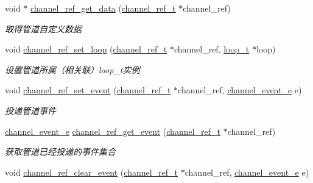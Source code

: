 \begin{DoxyCompactItemize}
void $\ast$ \hyperlink{a00049_ae6545b9c070a0bab99ccfefdf0b4a999_ae6545b9c070a0bab99ccfefdf0b4a999}{channel\+\_\+ref\+\_\+get\+\_\+data} (\hyperlink{a00051_a151271c9d188ef28d4d24bb81dcc1263_a151271c9d188ef28d4d24bb81dcc1263}{channel\+\_\+ref\+\_\+t} $\ast$channel\+\_\+ref)
\begin{DoxyCompactList}\small\item\em 取得管道自定义数据 \end{DoxyCompactList}\item 
void \hyperlink{a00049_ad7b9246a8768f761ffdd1756ea389181_ad7b9246a8768f761ffdd1756ea389181}{channel\+\_\+ref\+\_\+set\+\_\+loop} (\hyperlink{a00051_a151271c9d188ef28d4d24bb81dcc1263_a151271c9d188ef28d4d24bb81dcc1263}{channel\+\_\+ref\+\_\+t} $\ast$channel\+\_\+ref, \hyperlink{a00051_a9c3ad1cd2de83e09f3a7b59fa82c94ee_a9c3ad1cd2de83e09f3a7b59fa82c94ee}{loop\+\_\+t} $\ast$loop)
\begin{DoxyCompactList}\small\item\em 设置管道所属（相关联）loop\+\_\+t实例 \end{DoxyCompactList}\item 
void \hyperlink{a00049_aaa459c5e4bd63d343a31b5968a3ae5bd_aaa459c5e4bd63d343a31b5968a3ae5bd}{channel\+\_\+ref\+\_\+set\+\_\+event} (\hyperlink{a00051_a151271c9d188ef28d4d24bb81dcc1263_a151271c9d188ef28d4d24bb81dcc1263}{channel\+\_\+ref\+\_\+t} $\ast$channel\+\_\+ref, \hyperlink{a00051_a5ad43ab162fdf9ad53cde10ed3d87d99_a5ad43ab162fdf9ad53cde10ed3d87d99}{channel\+\_\+event\+\_\+e} e)
\begin{DoxyCompactList}\small\item\em 投递管道事件 \end{DoxyCompactList}\item 
\hyperlink{a00051_a5ad43ab162fdf9ad53cde10ed3d87d99_a5ad43ab162fdf9ad53cde10ed3d87d99}{channel\+\_\+event\+\_\+e} \hyperlink{a00049_ac24dbde77cfb71c60e1497dfe4cb49f3_ac24dbde77cfb71c60e1497dfe4cb49f3}{channel\+\_\+ref\+\_\+get\+\_\+event} (\hyperlink{a00051_a151271c9d188ef28d4d24bb81dcc1263_a151271c9d188ef28d4d24bb81dcc1263}{channel\+\_\+ref\+\_\+t} $\ast$channel\+\_\+ref)
\begin{DoxyCompactList}\small\item\em 获取管道已经投递的事件集合 \end{DoxyCompactList}\item 
void \hyperlink{a00049_a08e70ed62a98136a26d326e25d1dbeac_a08e70ed62a98136a26d326e25d1dbeac}{channel\+\_\+ref\+\_\+clear\+\_\+event} (\hyperlink{a00051_a151271c9d188ef28d4d24bb81dcc1263_a151271c9d188ef28d4d24bb81dcc1263}{channel\+\_\+ref\+\_\+t} $\ast$channel\+\_\+ref, \hyperlink{a00051_a5ad43ab162fdf9ad53cde10ed3d87d99_a5ad43ab162fdf9ad53cde10ed3d87d99}{channel\+\_\+event\+\_\+e} e)

\end{DoxyCompactItemize}
